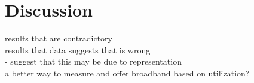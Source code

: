 \section{Discussion}
\label{sec:discussion}
results that are contradictory\\
results that data suggests that is wrong\\ 
- suggest that this may be due to representation\\
a better way to measure and offer broadband based on utilization?
